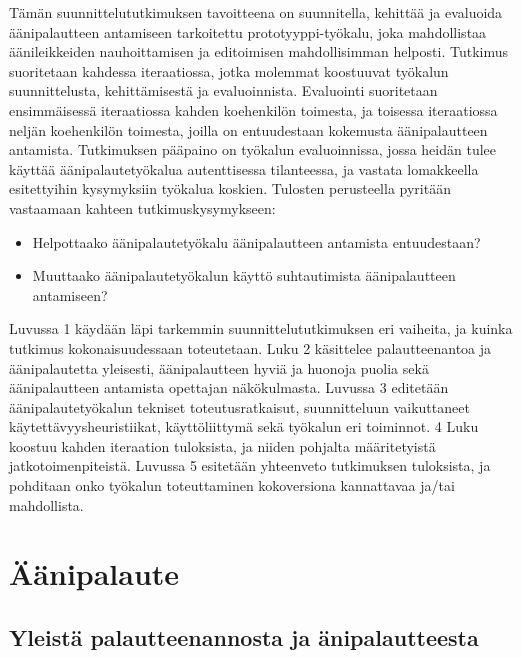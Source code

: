 \documentclass[utf8]{gradu3}
\begin{document}
Tämän suunnittelututkimuksen tavoitteena on suunnitella, kehittää ja evaluoida äänipalautteen antamiseen tarkoitettu prototyyppi-työkalu, joka mahdollistaa äänileikkeiden nauhoittamisen ja editoimisen mahdollisimman helposti. Tutkimus suoritetaan kahdessa iteraatiossa, jotka molemmat koostuuvat työkalun suunnittelusta, kehittämisestä ja evaluoinnista. Evaluointi suoritetaan ensimmäisessä iteraatiossa kahden koehenkilön toimesta, ja toisessa iteraatiossa neljän koehenkilön toimesta, joilla on entuudestaan kokemusta äänipalautteen antamista. Tutkimuksen pääpaino on työkalun evaluoinnissa, jossa heidän tulee käyttää äänipalautetyökalua autenttisessa tilanteessa, ja vastata lomakkeella esitettyihin kysymyksiin työkalua koskien. Tulosten perusteella pyritään vastaamaan kahteen tutkimuskysymykseen:

\begin{itemize}
  \item Helpottaako äänipalautetyökalu äänipalautteen antamista entuudestaan?
  \item Muuttaako äänipalautetyökalun käyttö suhtautimista äänipalautteen antamiseen?
\end{itemize}

Luvussa 1 käydään läpi tarkemmin suunnittelututkimuksen eri vaiheita, ja kuinka tutkimus kokonaisuudessaan toteutetaan. Luku 2 käsittelee palautteenantoa ja äänipalautetta yleisesti, äänipalautteen hyviä ja huonoja puolia sekä äänipalautteen antamista opettajan näkökulmasta. Luvussa 3 editetään äänipalautetyökalun tekniset toteutusratkaisut, suunnitteluun vaikuttaneet käytettävyysheuristiikat, käyttöliittymä sekä työkalun eri toiminnot. 4 Luku koostuu kahden iteraation tuloksista, ja niiden pohjalta määritetyistä jatkotoimenpiteistä. Luvussa 5 esitetään yhteenveto tutkimuksen tuloksista, ja pohditaan onko työkalun toteuttaminen kokoversiona kannattavaa ja/tai mahdollista.

\chapter{Äänipalaute}

\section{Yleistä palautteenannosta ja änipalautteesta}
\end{document}
